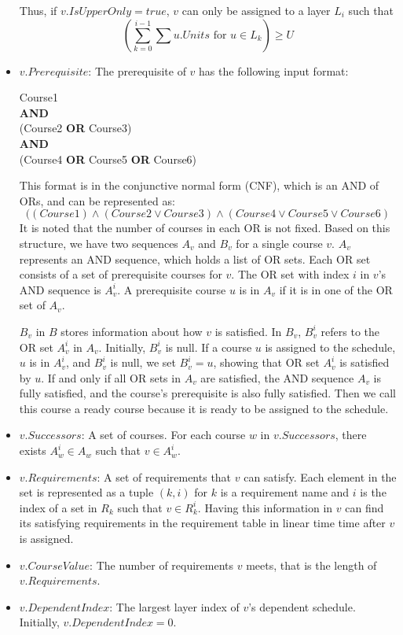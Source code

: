 \documentclass[letterpaper,12pt]{article}
\theoremstyle{definition}
\begin{document}
\begin{itemize}
    Thus, if $v.IsUpperOnly=true$, $v$ can only be assigned to a layer $L_i$ such that \[(\sum_{k=0}^{i-1} \sum u.Units \textrm{ for } u\in L_k) \geq U\]
    
    \item $v.Prerequisite$: The prerequisite of $v$ has the following input format:
    \begin{displayquote}
    Course1\\
    \textbf{AND}\\
    (Course2 \textbf{OR} Course3)\\
    \textbf{AND}\\
    (Course4 \textbf{OR} Course5 \textbf{OR} Course6)
    \end{displayquote}
    This format is in the conjunctive normal form (CNF), which is an AND of ORs, and can be represented as:
    $$((Course1) \wedge (Course2 \vee Course3) \wedge (Course4 \vee Course5 \vee Course6) $$
    It is noted that the number of courses in each OR is not fixed.
    Based on this structure, we have two sequences $A_v$ and $B_v$ for a single course $v$. $A_v$ represents an AND sequence, which holds a list of OR sets. Each OR set consists of a set of prerequisite courses for $v$. The OR set with index $i$ in $v$'s AND sequence is $A_v^i$. A prerequisite course $u$ is in $A_v$ if it is in one of the OR set of $A_v$.
    
    $B_v$ in $B$ stores information about how $v$ is satisfied. In $B_v$, $B_v^i$ refers to the OR set $A_v^i$ in $A_v$. Initially, $B_v^i$ is null. If a course $u$ is assigned to the schedule, $u$ is in $A_v^i$, and $B_v^i$ is null, we set $B_v^i=u$, showing that OR set $A_v^i$ is satisfied by $u$. If and only if all OR sets in $A_v$ are satisfied, the AND sequence $A_v$ is fully satisfied, and the course's prerequisite is also fully satisfied. Then we call this course a ready course because it is ready to be assigned to the schedule. 
    \item $v.Successors$: A set of courses. For each course $w$ in $v.Successors$, there exists $A_w^i \in A_w$ such that $v \in A_w^i$.  
    \item $v.Requirements$: A set of requirements that $v$ can satisfy.
    Each element in the set is represented as a tuple $(k,i)$ for $k$ is a requirement name and $i$ is the index of a set in $R_k$ such that $v\in R_k^i$. 
    Having this information in $v$ can find its satisfying requirements in the requirement table in linear time time after $v$ is assigned. 
    \item $v.CourseValue$: The number of requirements $v$ meets, that is the length of $v.Requirements$. 
    \item $v.DependentIndex$: The largest layer index of $v$'s dependent schedule. Initially, $v.DependentIndex=0$.
\end{itemize}
\end{document}
